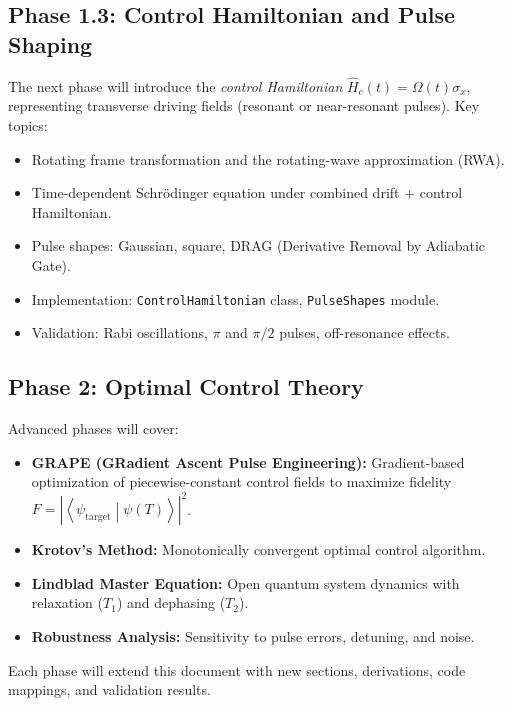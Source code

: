 \documentclass[11pt,a4paper]{article}
\theoremstyle{definition}
\theoremstyle{remark}
\newcommand{\braket}[2]{\left\langle#1\middle|#2\right\rangle}
\begin{document}
\subsection{Phase 1.3: Control Hamiltonian and Pulse Shaping}

The next phase will introduce the \emph{control Hamiltonian} $\hat{H}_c(t) = \Omega(t) \sigma_x$, representing transverse driving fields (resonant or near-resonant pulses). Key topics:

\begin{itemize}
    \item Rotating frame transformation and the rotating-wave approximation (RWA).
    \item Time-dependent Schrödinger equation under combined drift + control Hamiltonian.
    \item Pulse shapes: Gaussian, square, DRAG (Derivative Removal by Adiabatic Gate).
    \item Implementation: \texttt{ControlHamiltonian} class, \texttt{PulseShapes} module.
    \item Validation: Rabi oscillations, $\pi$ and $\pi/2$ pulses, off-resonance effects.
\end{itemize}

\subsection{Phase 2: Optimal Control Theory}

Advanced phases will cover:

\begin{itemize}
    \item \textbf{GRAPE (GRadient Ascent Pulse Engineering):} Gradient-based optimization of piecewise-constant control fields to maximize fidelity $F = |\braket{\psi_{\text{target}}}{\psi(T)}|^2$.
    \item \textbf{Krotov's Method:} Monotonically convergent optimal control algorithm.
    \item \textbf{Lindblad Master Equation:} Open quantum system dynamics with relaxation ($T_1$) and dephasing ($T_2$).
    \item \textbf{Robustness Analysis:} Sensitivity to pulse errors, detuning, and noise.
\end{itemize}

Each phase will extend this document with new sections, derivations, code mappings, and validation results.

\end{document}
